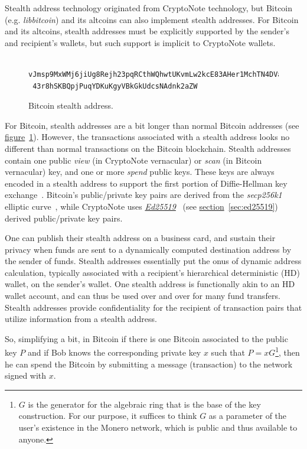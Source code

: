 Stealth address technology originated from CryptoNote technology, but Bitcoin (e.g. \emph{libbitcoin}) and its altcoins can also implement stealth addresses. For Bitcoin and its altcoins, stealth addresses must be explicitly supported by the sender's and recipient's wallets, but such support is implicit to CryptoNote wallets.
\begin{figure}
  \begin{verbatim}
 vJmsp9MxWMj6jiUg8Rejh23pqRCthWQhwtUKvmLw2kcE83AHer1MchTN4DVacHt
 43r8hSKBQpjPuqYDKuKgyVBkGkUdcsNAdnk2aZW
  \end{verbatim}
  \caption{Bitcoin stealth address.}
  \label{fig:btcstealth}
\end{figure}

For Bitcoin, stealth addresses are a bit longer than normal Bitcoin addresses (see \hyperref[fig:btcstealth]{figure}~\ref{fig:btcstealth}). However, the transactions associated with a stealth address looks no different than normal transactions on the Bitcoin blockchain. Stealth addresses contain one public \emph{view} (in CryptoNote vernacular) or \emph{scan} (in Bitcoin vernacular) key, and one or more \emph{spend} public keys. These keys are always encoded in a stealth address to support the first portion of Diffie-Hellman key exchange~\cite{Diffie:2006:NDC:2263321.2269104}. Bitcoin's public/private key pairs are derived from the \emph{secp256k1} elliptic curve~\cite{secg}, while CryptoNote uses \hyperref[sec:ed25519]{\emph{Ed25519}}~\cite{curve25519} (see \hyperref[sec:ed25519]{section}~\ref{sec:ed25519}) derived public/private key pairs.

One can publish their stealth address on a business card, and sustain their privacy when funds are sent to a dynamically computed destination address by the sender of funds. Stealth addresses essentially put the onus of dynamic address calculation, typically associated with a recipient's hierarchical deterministic (HD) wallet, on the sender's wallet. One stealth address is functionally akin to an HD wallet account, and can thus be used over and over for many fund transfers. Stealth addresses provide confidentiality for the recipient of transaction pairs that utilize information from a stealth address.

So, simplifying a bit, in Bitcoin if there is one Bitcoin associated to the public key $P$ and if Bob knows the corresponding private key $x$ such that $P = xG$\footnote{$G$ is the generator for the algebraic ring that is the base of the key construction. For our purpose, it suffices to think $G$ as a parameter of the user's existence in the Monero network, which is public and thus available to anyone.}, then he can spend the Bitcoin by submitting a message (transaction) to the network signed with $x$.
\pagebreak

